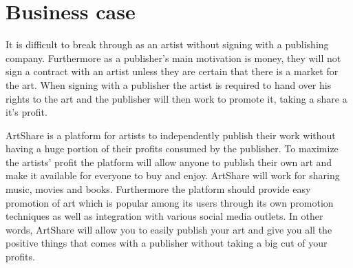 \documentclass[../report.tex]{subfiles}
\begin{document}
\section{Business case}
It is difficult to break through as an artist without signing with a publishing company. Furthermore as a publisher's main motivation is money, they will not sign a contract with an artist unless they are certain that there is a market for the art. When signing with a publisher the artist is required to hand over his rights to the art and the publisher will then work to promote it, taking a share a it's profit.



\noindent ArtShare is a platform for artists to independently publish their work without having a huge portion of their profits consumed by the publisher. To maximize the artists' profit the platform will allow anyone to publish their own art and make it available for everyone to buy and enjoy. ArtShare will work for sharing music, movies and books. Furthermore the platform should provide easy promotion of art which is popular among its users through its own promotion techniques as well as integration with various social media outlets. In other words, ArtShare will allow you to easily publish your art and give you all the positive things that comes with a publisher without taking a big cut of your profits. 

\end{document}
